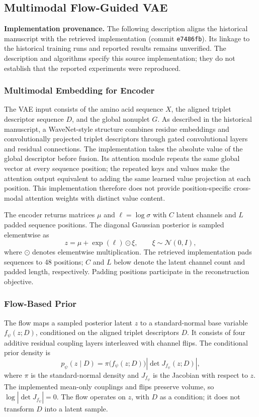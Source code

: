 \documentclass[journal]{IEEEtran}
\begin{document}
\subsection{Multimodal Flow-Guided VAE}

\textbf{Implementation provenance.} The following description aligns the historical manuscript with the retrieved implementation (commit \texttt{e7486fb}). Its linkage to the historical training runs and reported results remains unverified. The description and algorithms specify this source implementation; they do not establish that the reported experiments were reproduced.

\subsubsection{Multimodal Embedding for Encoder}

The VAE input consists of the amino acid sequence $X$, the aligned triplet descriptor sequence $D$, and the global nonuplet $G$. As described in the historical manuscript, a WaveNet-style structure combines residue embeddings and convolutionally projected triplet descriptors through gated convolutional layers and residual connections. The implementation takes the absolute value of the global descriptor before fusion. Its attention module repeats the same global vector at every sequence position; the repeated keys and values make the attention output equivalent to adding the same learned value projection at each position. This implementation therefore does not provide position-specific cross-modal attention weights with distinct value content.

The encoder returns matrices $\mu$ and $\ell=\log\sigma$ with $C$ latent channels and $L$ padded sequence positions. The diagonal Gaussian posterior is sampled elementwise as
\begin{equation}
 z=\mu+\exp(\ell)\odot\xi,\qquad \xi\sim\mathcal{N}(0,I),
\end{equation}
where $\odot$ denotes elementwise multiplication. The retrieved implementation pads sequences to 48 positions; $C$ and $L$ below denote the latent channel count and padded length, respectively. Padding positions participate in the reconstruction objective.

\subsubsection{Flow-Based Prior}

The flow maps a sampled posterior latent $z$ to a standard-normal base variable $f_\psi(z;D)$, conditioned on the aligned triplet descriptors $D$. It consists of four additive residual coupling layers interleaved with channel flips. The conditional prior density is
\begin{equation}
 p_\psi(z\mid D)=\pi\bigl(f_\psi(z;D)\bigr)\left|\det J_{f_\psi}(z;D)\right|,
\end{equation}
where $\pi$ is the standard-normal density and $J_{f_\psi}$ is the Jacobian with respect to $z$. The implemented mean-only couplings and flips preserve volume, so $\log|\det J_{f_\psi}|=0$. The flow operates on $z$, with $D$ as a condition; it does not transform $D$ into a latent sample.
\end{document}
